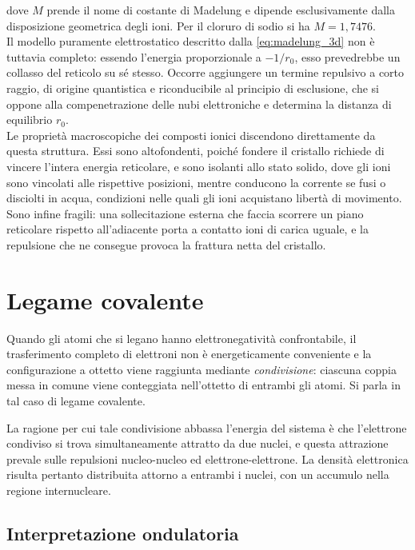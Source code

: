 dove $M$ prende il nome di costante di Madelung e dipende esclusivamente dalla disposizione geometrica degli ioni. Per il cloruro di sodio si ha $M = 1,7476$.\\

Il modello puramente elettrostatico descritto dalla \eqref{eq:madelung_3d} non è tuttavia completo: essendo l'energia proporzionale a $-1/r_0$, esso prevedrebbe un collasso del reticolo su sé stesso. 
Occorre aggiungere un termine repulsivo a corto raggio, di origine quantistica e riconducibile al principio di esclusione, che si oppone alla compenetrazione delle nubi elettroniche e determina la distanza di equilibrio $r_0$.\\

Le proprietà macroscopiche dei composti ionici discendono direttamente da questa struttura. Essi sono altofondenti, poiché fondere il cristallo richiede di vincere l'intera energia reticolare, e sono isolanti allo stato solido, dove gli ioni sono vincolati alle rispettive posizioni, mentre conducono la corrente se fusi o disciolti in acqua, condizioni nelle quali gli ioni acquistano libertà di movimento. Sono infine fragili: una sollecitazione esterna che faccia scorrere un piano reticolare rispetto all'adiacente porta a contatto ioni di carica uguale, e la repulsione che ne consegue provoca la frattura netta del cristallo.\\

\newpage

\section{Legame covalente}

Quando gli atomi che si legano hanno elettronegatività confrontabile, il trasferimento completo di elettroni non è energeticamente conveniente e la configurazione a ottetto viene raggiunta mediante \emph{condivisione}: ciascuna coppia messa in comune viene conteggiata nell'ottetto di entrambi gli atomi. 
Si parla in tal caso di legame covalente.

La ragione per cui tale condivisione abbassa l'energia del sistema è che l'elettrone condiviso si trova simultaneamente attratto da due nuclei, e questa attrazione prevale sulle repulsioni nucleo-nucleo ed elettrone-elettrone. 
La densità elettronica risulta pertanto distribuita attorno a entrambi i nuclei, con un accumulo nella regione internucleare.

\subsection{Interpretazione ondulatoria}

